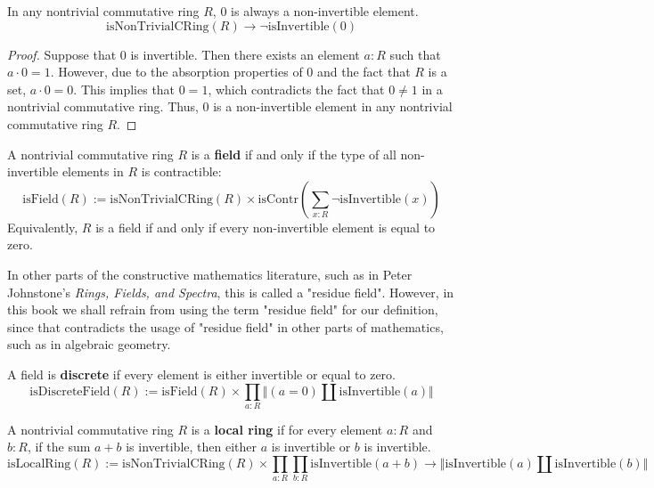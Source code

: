 \begin{theorem}
In any nontrivial commutative ring $R$, $0$ is always a non-invertible element. 
$$\mathrm{isNonTrivialCRing}(R) \to \neg \mathrm{isInvertible}(0)$$
\end{theorem}

\begin{proof}
Suppose that $0$ is invertible. Then there exists an element $a:R$ such that $a \cdot 0 = 1$. However, due to the absorption properties of $0$ and the fact that $R$ is a set, $a \cdot 0 = 0$. This implies that $0 = 1$, which contradicts the fact that $0 \neq 1$ in a nontrivial commutative ring. Thus, $0$ is a non-invertible element in any nontrivial commutative ring $R$. 
\end{proof}

\begin{definition}
A nontrivial commutative ring $R$ is a \textbf{field} if and only if the type of all non-invertible elements in $R$ is contractible:
$$\mathrm{isField}(R) := \mathrm{isNonTrivialCRing}(R) \times \mathrm{isContr}\left(\sum_{x:R} \neg \mathrm{isInvertible}(x)\right)$$ 
Equivalently, $R$ is a field if and only if every non-invertible element is equal to zero. 
\end{definition}

\begin{remark}
In other parts of the constructive mathematics literature, such as in Peter Johnstone's \textit{Rings, Fields, and Spectra}, this is called a "residue field". However, in this book we shall refrain from using the term "residue field" for our definition, since that contradicts the usage of "residue field" in other parts of mathematics, such as in algebraic geometry. 
\end{remark}

\begin{definition}
A field is \textbf{discrete} if every element is either invertible or equal to zero. 
$$\mathrm{isDiscreteField}(R) := \mathrm{isField}(R) \times \prod_{a:R} \Vert(a = 0) \amalg \mathrm{isInvertible}(a)\Vert$$ 
\end{definition}

\begin{definition}
A nontrivial commutative ring $R$ is a \textbf{local ring} if for every element $a:R$ and $b:R$, if the sum $a + b$ is invertible, then either $a$ is invertible or $b$ is invertible. 
$$\mathrm{isLocalRing}(R) := \mathrm{isNonTrivialCRing}(R) \times \prod_{a:R} \prod_{b:R} \mathrm{isInvertible}(a + b) \to \Vert\mathrm{isInvertible}(a) \amalg \mathrm{isInvertible}(b)\Vert$$ 
\end{definition}

